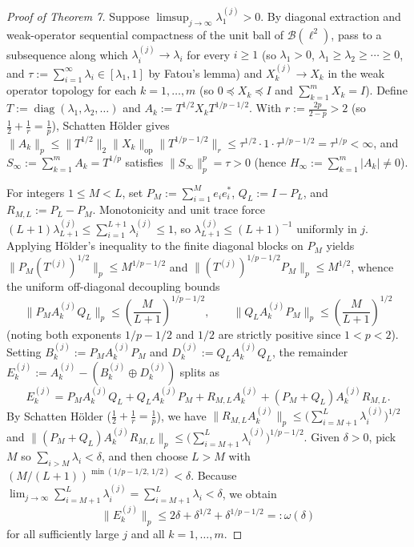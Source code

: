 \documentclass[10pt,letterpaper]{article}
\newcommand{\diag}{\operatorname{diag}}
\newcommand{\op}{\mathrm{op}}
\begin{document}
\begin{proof}[Proof of Theorem 7]
Suppose $\limsup_{j\to\infty} \lambda_1^{(j)} > 0$. By diagonal extraction and weak-operator sequential compactness of the unit ball of $\mathcal{B}(\ell^2)$, pass to a subsequence along which $\lambda_i^{(j)} \to \lambda_i$ for every $i \ge 1$ (so $\lambda_1 > 0$, $\lambda_1 \ge \lambda_2 \ge \cdots \ge 0$, and $\tau := \sum_{i=1}^\infty \lambda_i \in [\lambda_1, 1]$ by Fatou's lemma) and $X_k^{(j)} \to X_k$ in the weak operator topology for each $k = 1,\dots,m$ (so $0 \preceq X_k \preceq I$ and $\sum_{k=1}^m X_k = I$). Define $T := \diag(\lambda_1, \lambda_2, \dots)$ and $A_k := T^{1/2} X_k T^{1/p - 1/2}$. With $r := \frac{2p}{2-p} > 2$ (so $\frac{1}{2} + \frac{1}{r} = \frac{1}{p}$), Schatten H\"older gives $\|A_k\|_p \le \|T^{1/2}\|_2 \|X_k\|_{\op} \|T^{1/p - 1/2}\|_r \le \tau^{1/2}\cdot 1 \cdot \tau^{1/p - 1/2} = \tau^{1/p} < \infty$, and $S_\infty := \sum_{k=1}^m A_k = T^{1/p}$ satisfies $\|S_\infty\|_p^p = \tau > 0$ (hence $H_\infty := \sum_{k=1}^m |A_k| \neq 0$).

For integers $1 \le M < L$, set $P_M := \sum_{i=1}^M e_i e_i^*$, $Q_L := I - P_L$, and $R_{M,L} := P_L - P_M$. Monotonicity and unit trace force $(L+1)\lambda_{L+1}^{(j)} \le \sum_{i=1}^{L+1} \lambda_i^{(j)} \le 1$, so $\lambda_{L+1}^{(j)} \le (L+1)^{-1}$ uniformly in $j$. Applying H\"older's inequality to the finite diagonal blocks on $P_M$ yields $\|P_M (T^{(j)})^{1/2}\|_p \le M^{1/p - 1/2}$ and $\|(T^{(j)})^{1/p - 1/2} P_M\|_p \le M^{1/2}$, whence the uniform off-diagonal decoupling bounds
\[
  \bigl\|P_M A_k^{(j)} Q_L\bigr\|_p \le \left(\frac{M}{L+1}\right)^{1/p - 1/2},
  \qquad
  \bigl\|Q_L A_k^{(j)} P_M\bigr\|_p \le \left(\frac{M}{L+1}\right)^{1/2}
\]
(noting both exponents $1/p - 1/2$ and $1/2$ are strictly positive since $1 < p < 2$). Setting $B_k^{(j)} := P_M A_k^{(j)} P_M$ and $D_k^{(j)} := Q_L A_k^{(j)} Q_L$, the remainder $E_k^{(j)} := A_k^{(j)} - (B_k^{(j)} \oplus D_k^{(j)})$ splits as
\[
  E_k^{(j)} = P_M A_k^{(j)} Q_L + Q_L A_k^{(j)} P_M + R_{M,L} A_k^{(j)} + (P_M + Q_L) A_k^{(j)} R_{M,L}.
\]
By Schatten H\"older ($\frac{1}{2} + \frac{1}{r} = \frac{1}{p}$), we have $\|R_{M,L} A_k^{(j)}\|_p \le \bigl(\sum_{i=M+1}^L \lambda_i^{(j)}\bigr)^{1/2}$ and $\|(P_M + Q_L) A_k^{(j)} R_{M,L}\|_p \le \bigl(\sum_{i=M+1}^L \lambda_i^{(j)}\bigr)^{1/p - 1/2}$. Given $\delta > 0$, pick $M$ so $\sum_{i>M} \lambda_i < \delta$, and then choose $L > M$ with $(M/(L+1))^{\min(1/p - 1/2,\, 1/2)} < \delta$. Because $\lim_{j\to\infty} \sum_{i=M+1}^L \lambda_i^{(j)} = \sum_{i=M+1}^L \lambda_i < \delta$, we obtain
\[
  \bigl\|E_k^{(j)}\bigr\|_p \le 2\delta + \delta^{1/2} + \delta^{1/p - 1/2} =: \omega(\delta)
\]
for all sufficiently large $j$ and all $k = 1,\dots,m$.


\end{proof}
\end{document}
